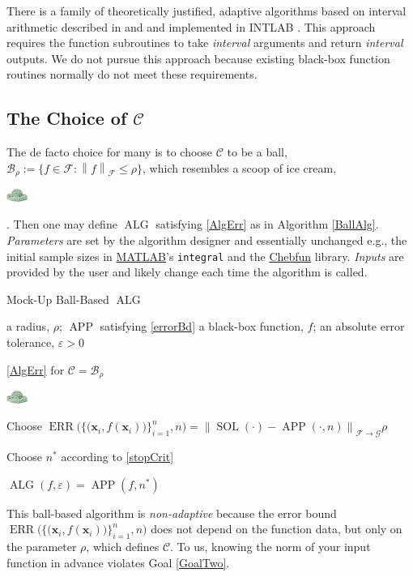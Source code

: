 \documentclass[11pt]{NSFamsart}
\newcommand{\MATLAB}{\hyperlink{MATLABlink}{MATLAB}\xspace}
\newcommand{\Chebfun}{\hyperlink{Chebfunlink}{Chebfun}\xspace}
\DeclareMathOperator{\SOL}{SOL}
\DeclareMathOperator{\APP}{APP}
\DeclareMathOperator{\ALG}{ALG}
\DeclareMathOperator{\ERR}{ERR}
\newcommand{\bx}{{\boldsymbol{x}}}
\newcommand{\cc}{\mathcal{C}}
\newcommand{\cb}{\mathcal{B}}
\newcommand{\calc}{{\mathcal{C}}}
\newcommand{\calf}{{\mathcal{F}}}
\newcommand{\calg}{{\mathcal{G}}}
\newcommand{\norm}[2][{}]{\ensuremath{\left \lVert #2 \right \rVert}_{#1}}
\newcommand{\dataN}{\bigl\{\bigl(\bx_i,f(\bx_i)\bigr)\bigr\}_{i=1}^n}
\newcommand{\ErrN}{\ERR\bigl(\dataN,n\bigr)}
\newcommand{\smallerscoop}{\parbox{0.7cm}{\includegraphics[width=0.7cm]{ProgramsImages/IceCreamScoop.eps}}\xspace}
\begin{document}
There is a family of theoretically justified, adaptive algorithms based on interval 
arithmetic described in \cite{MoKeCl09} and \cite{Rum10a} and implemented in INTLAB 
\cite{Rum99a}.  This approach requires the function subroutines to take \emph{interval} arguments 
and return \emph{interval} outputs.  We do not pursue this approach because existing black-box 
function routines normally do not meet these requirements.

\subsection{The Choice of $\calc$} \label{sec:CChoice}

The de facto choice for many is to choose $\calc$ to be a ball, $\cb_{\rho} := \{f \in \calf : \norm[\calf]{f} \le \rho \}$, which resembles a scoop of ice cream, \smallerscoop.  Then one may define $\ALG$ satisfying \eqref{AlgErr} as in Algorithm \ref{BallAlg}. \emph{Parameters} are set by the algorithm designer and essentially unchanged e.g., the initial sample sizes in \MATLAB's \texttt{integral} and the \Chebfun library.  \emph{Inputs} are provided by the user and likely change each time the algorithm is called.

\begin{algorithm}
	\caption{Mock-Up Ball-Based $\ALG$ \label{BallAlg}} 
	\begin{algorithmic}
	\PARAM a radius, $\rho$; $\APP$ satisfying \eqref{errorBd}
		\INPUT a black-box function, $f$; an absolute error tolerance,
		$\varepsilon>0$

\Ensure \eqref{AlgErr} for $\cc = \cb_{\rho}$\smallerscoop

\State Choose $\ErrN = \norm[\calf \to \calg]{\SOL(\cdot) - \APP(\cdot,n)} \rho$ 

\State Choose $n^*$ according to \eqref{stopCrit}

\RETURN $\ALG(f,\varepsilon) = \APP(f,n^*)$
\end{algorithmic}
\end{algorithm}

This ball-based algorithm is \emph{non-adaptive} because the error bound $\ErrN$ does not depend on the function data, but only on the parameter $\rho$, which defines $\calc$.  To us, knowing the norm of your input function in advance violates Goal \ref{GoalTwo}.  
\end{document}
